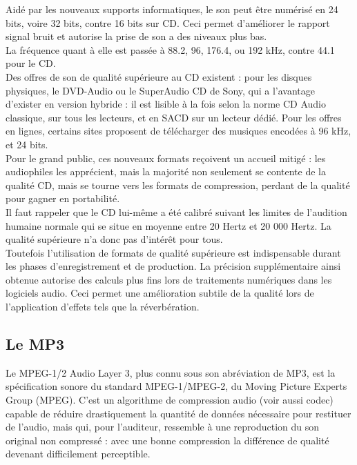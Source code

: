 \documentclass[12pt,a4paper]{report}
\begin{document}
Aidé par les nouveaux supports informatiques, le son peut être numérisé en 24 bits, voire 32 bits, contre 16 bits sur CD. Ceci permet d'améliorer le rapport signal bruit et autorise la prise de son a des niveaux plus bas.\\

La fréquence quant à elle est passée à 88.2, 96, 176.4, ou 192 kHz, contre 44.1 pour le CD.\\

Des offres de son de qualité supérieure au CD existent : pour les disques physiques, le DVD-Audio ou le SuperAudio CD de Sony, qui a l'avantage d'exister en version hybride : il est lisible à la fois selon la norme CD Audio classique, sur tous les lecteurs, et en SACD sur un lecteur dédié. Pour les offres en lignes, certains sites proposent de télécharger des musiques encodées à 96 kHz, et 24 bits.\\

Pour le grand public, ces nouveaux formats reçoivent un accueil mitigé : les audiophiles les apprécient, mais la majorité non seulement se contente de la qualité CD, mais se tourne vers les formats de compression, perdant de la qualité pour gagner en portabilité.\\

Il faut rappeler que le CD lui-même a été calibré suivant les limites de l'audition humaine normale qui se situe en moyenne entre 20 Hertz et 20 000 Hertz. La qualité supérieure n'a donc pas d'intérêt pour tous.\\

Toutefois l'utilisation de formats de qualité supérieure est indispensable durant les phases d'enregistrement et de production. La précision supplémentaire ainsi obtenue autorise des calculs plus fins lors de traitements numériques dans les logiciels audio. Ceci permet une amélioration subtile de la qualité lors de l'application d'effets tels que la réverbération.\\

\subsection{Le MP3}

Le MPEG-1/2 Audio Layer 3, plus connu sous son abréviation de MP3, est la spécification sonore du standard MPEG-1/MPEG-2, du Moving Picture Experts Group (MPEG). C'est un algorithme de compression audio (voir aussi codec) capable de réduire drastiquement la quantité de données nécessaire pour restituer de l'audio, mais qui, pour l'auditeur, ressemble à une reproduction du son original non compressé : avec une bonne compression la différence de qualité devenant difficilement perceptible.\\
\end{document}
